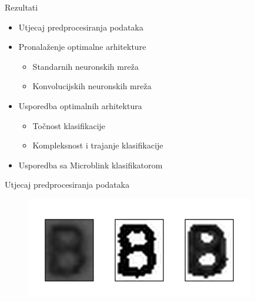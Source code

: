 \documentclass[pdf]{beamer}
\begin{document}
\begin{frame}{Rezultati}

\begin{itemize}
\setlength\itemsep{0.5em}

 \item Utjecaj predprocesiranja podataka
 
 \item Pronalaženje optimalne arhitekture
 \begin{itemize}
 	\item  Standarnih neuronskih mreža
 	\item Konvolucijskih neuronskih mreža
 \end{itemize}

 \item Usporedba optimalnih arhitektura
 \begin{itemize}
 	\item  Točnost klasifikacije
 	\item Kompleksnost i trajanje klasifikacije
 \end{itemize}
 
 \item Usporedba sa Microblink klasifikatorom
 
\end{itemize}

\end{frame}

\begin{frame}{Utjecaj predprocesiranja podataka}

\begin{figure}
\centering
\includegraphics[width=10cm]{slike/preprocessing_comparison.png}
\end{figure}

\begin{table}
\begin{center}
\centering
{}
\end{center}
\end{table}

\end{frame}
\end{document}
